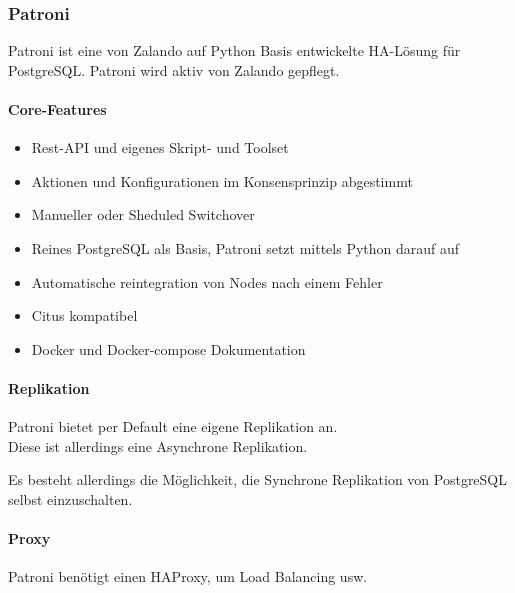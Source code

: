 
\begin{flushleft}
    \subsubsection{Patroni}
    Patroni ist eine von Zalando auf Python Basis entwickelte HA-Lösung für PostgreSQL.
    Patroni wird aktiv von Zalando gepflegt.
\end{flushleft}
\begin{flushleft}
    \paragraph{Core-Features}
    \begin{itemize}
        \item Rest-API und eigenes Skript- und Toolset
        \item Aktionen und Konfigurationen im Konsensprinzip abgestimmt
        \item Manueller oder Sheduled Switchover
        \item Reines PostgreSQL als Basis, Patroni setzt mittels Python darauf auf
        \item Automatische reintegration von Nodes nach einem Fehler
        \item Citus kompatibel
        \item Docker und Docker-compose Dokumentation
    \end{itemize}
\end{flushleft}
\begin{flushleft}
    \paragraph{Replikation}
    Patroni bietet per Default eine eigene Replikation an.\\
    Diese ist allerdings eine Asynchrone Replikation.
\begin{flushleft}
    Es besteht allerdings die Möglichkeit, die Synchrone Replikation von PostgreSQL selbst einzuschalten.
\end{flushleft}
\end{flushleft}
\begin{flushleft}
    \paragraph{Proxy}
    Patroni benötigt einen \Gls{HAProxy}, um Load Balancing usw. \cite{VYXTI7BS}
\end{flushleft}
